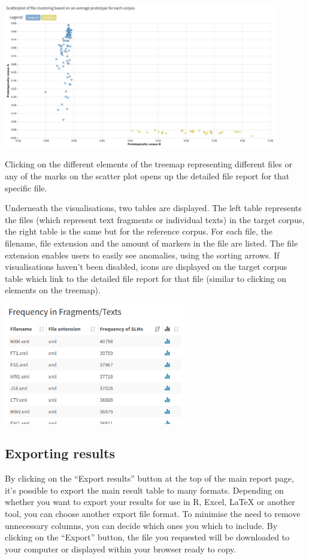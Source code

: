\documentclass[11pt,a4paper]{article}
\begin{document}
\centerline{\includegraphics[width=0.9\textwidth]{images/proto.png}}

Clicking on the different elements of the treemap representing different files or any of the marks on the scatter plot opens up the detailed file report for that specific file.

Underneath the visualisations, two tables are displayed. The left table represents the files (which represent text fragments or individual texts) in the target corpus, the right table is the same but for the reference corpus. For each file, the filename, file extension and the amount of markers in the file are listed. The file extension enables users to easily see anomalies, using the sorting arrows. If visualisations haven't been disabled, icons are displayed on the target corpus table which link to the detailed file report for that file (similar to clicking on elements on the treemap).

\centerline{\includegraphics[width=0.6\textwidth]{images/mainreport_frac.png}}

\subsection{Exporting results}

By clicking on the ``Export results'' button at the top of the main report page, it's possible to export the main result table to many formats. Depending on whether you want to export your results for use in R, Excel, LaTeX or another tool, you can choose another export file format. To minimise the need to remove unnecessary columns, you can decide which ones you which to include. By clicking on the ``Export'' button, the file you requested will be downloaded to your computer or displayed within your browser ready to copy.
\end{document}
